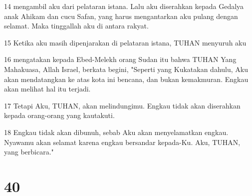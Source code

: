 \par 14 mengambil aku dari pelataran istana. Lalu aku diserahkan kepada Gedalya anak Ahikam dan cucu Safan, yang harus mengantarkan aku pulang dengan selamat. Maka tinggallah aku di antara rakyat.
\par 15 Ketika aku masih dipenjarakan di pelataran istana, TUHAN menyuruh aku
\par 16 mengatakan kepada Ebed-Melekh orang Sudan itu bahwa TUHAN Yang Mahakuasa, Allah Israel, berkata begini, "Seperti yang Kukatakan dahulu, Aku akan mendatangkan ke atas kota ini bencana, dan bukan kemakmuran. Engkau akan melihat hal itu terjadi.
\par 17 Tetapi Aku, TUHAN, akan melindungimu. Engkau tidak akan diserahkan kepada orang-orang yang kautakuti.
\par 18 Engkau tidak akan dibunuh, sebab Aku akan menyelamatkan engkau. Nyawamu akan selamat karena engkau bersandar kepada-Ku. Aku, TUHAN, yang berbicara."

\chapter{40}

